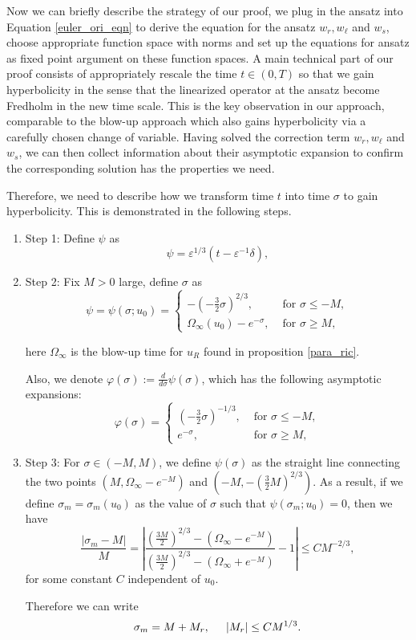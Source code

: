 \documentclass[letterpaper,11pt]{article}
\newcommand{\eps}{\varepsilon}
\numberwithin{equation}{section}
\theoremstyle{plain}
\begin{document}
Now we can briefly describe the strategy of our proof, we plug in the ansatz into Equation \eqref{euler_ori_eqn} to derive the equation for the ansatz $w_r, w_\ell $ and $w_s$, choose appropriate function space with norms and set up the equations for ansatz as fixed point argument on these function spaces. A main technical part of our proof consists of appropriately rescale the time $t \in (0,T)$ so that we gain hyperbolicity in the sense that the linearized operator at the ansatz become Fredholm in the new time scale. This is the key observation in our approach, comparable to the blow-up approach which also gains hyperbolicity via a carefully chosen change of variable. Having solved the correction term $w_r, w_\ell$ and $w_s$, we can then collect information about their asymptotic expansion to confirm the corresponding solution has the properties we need.


Therefore, we need to describe how we transform time $t$ into time $\sigma$ to gain hyperbolicity. This is demonstrated in the following steps.
\begin{enumerate}
\item Step 1: Define $\psi$ as
\[
\psi = \eps^{1/3}(t - \eps^{-1}\delta),
\]

\item Step 2:
Fix $M>0$ large, define $\sigma$ as
\begin{equation} \label{psi_def}
\psi = \psi(\sigma; u_0) =\begin{cases}
-(-\frac{3}{2} \sigma)^{2/3} , &\text{ for }\sigma \le -M, \\
\Omega_\infty(u_0) -e^{-\sigma}, &\text{ for }\sigma \ge M,
\end{cases}
\end{equation}

here $\Omega_\infty$ is the blow-up time for $u_R$ found in proposition \ref{para_ric}.

Also, we denote $\varphi(\sigma) := \frac{d}{d\sigma}\psi(\sigma)$, which has the following asymptotic expansions: 
\begin{equation} \label{phi_def}
\varphi(\sigma)  =\begin{cases}
(-\frac{3}{2} \sigma)^{-1/3} , &\text{ for }\sigma \le -M, \\
e^{-\sigma}, &\text{ for }\sigma \ge M,
\end{cases}
\end{equation}
\item Step 3: For $\sigma \in (-M, M)$, we define $\psi(\sigma)$ as the straight line connecting the two points $(M, \Omega_\infty-e^{-M})$ and $(-M, -(\frac{3}{2}M)^{2/3})$. As a result, if we define $\sigma_m=\sigma_m(u_0)$ as the value of $\sigma$ such that $\psi(\sigma_m; u_0) = 0$, then we have 
\[
\frac{|\sigma_m - M|}{M} = \left| \frac{(\frac{3M}{2})^{2/3}-(\Omega_\infty-e^{-M})}{(\frac{3M}{2})^{2/3}-(\Omega_\infty+e^{-M})} -1 \right|\le CM^{-2/3},
\] 
for some constant $C$ independent of $u_0$.

Therefore we can write
\begin{equation}\label{sigm_asy}
\sigma_m = M + M_r, \hspace{0.2in} |M_r| \le CM^{1/3}.
\end{equation}
\end{enumerate}
\end{document}
